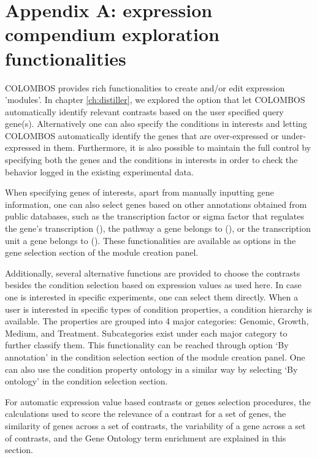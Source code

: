 \chapter{Appendix A: expression compendium exploration 
functionalities}\label{ch:apd-colombos}

\instructionsappendices

COLOMBOS provides rich functionalities to create and/or edit expression 'modules'. In chapter \ref{ch:distiller}, we explored the option that let COLOMBOS automatically identify relevant contrasts based on the user specified query gene(s). Alternatively one can also specify the conditions in interests and letting COLOMBOS automatically identify the genes that are over-expressed or under-expressed in them.  Furthermore, it is also possible to maintain the full control by specifying both the genes and the conditions in interests in order to check the behavior logged in the existing experimental data.

When specifying genes of interests, apart from manually inputting gene information, one can also select genes based on other annotations obtained from public databases, such as the transcription factor or sigma factor that regulates the gene’s transcription (\cite{Gama-Castro2008}), the pathway a gene belongs to (\cite{Karp2005}), or the transcription unit a gene belongs to (\cite{Karp2005}).  These functionalities are available as options in the gene selection section of the module creation panel.

Additionally, several alternative functions are provided to choose the contrasts besides the condition selection based on expression values as used here. In case one is interested in specific experiments, one can select them directly. When a user is interested in specific types of condition properties, a condition hierarchy is available. The properties are grouped into 4 major categories: Genomic, Growth, Medium, and Treatment.  Subcategories exist under each major category to further classify them.  This functionality can be reached through option `By annotation' in the condition selection section of the module creation panel.  One can also use the condition property ontology in a similar way by selecting `By ontology' in the condition selection section.

For automatic expression value based contrasts or genes selection procedures, the calculations used to score the relevance of a contrast for a set of genes, the similarity of genes across a set of contrasts, the variability of a gene across a set of contrasts, and the Gene Ontology term enrichment are explained in this section.

